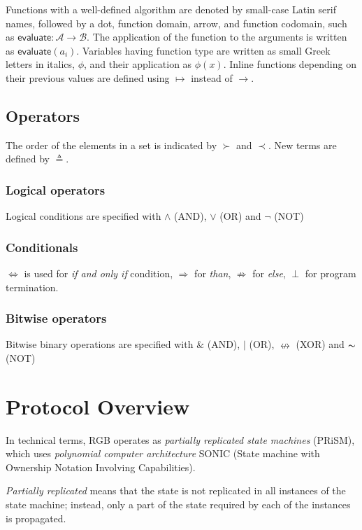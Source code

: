 \documentclass[9pt,oneside]{amsart}
\begin{document}
\begin{multicols}{2}
Functions with a well-defined algorithm are denoted by small-case Latin serif names,
followed by a dot, function domain, arrow, and function codomain,
such as $\mathsf{evaluate}: \mathcal{A} \rightarrow \mathcal{B}$.
The application of the function to the arguments is written as $\mathsf{evaluate}(a_i)$.
Variables having function type are written as small Greek letters in italics, $\phi$,
and their application as $\phi(x)$.
Inline functions depending on their previous values are defined using
$\mapsto$ instead of $\rightarrow$.

\subsection{Operators}
The order of the elements in a set is indicated by $\succ$ and $\prec$.
New terms are defined by $\triangleq$.

\subsubsection{Logical operators}
Logical conditions are specified with $\land$ (AND), $\lor$ (OR) and $\lnot$ (NOT)

\subsubsection{Conditionals}
$\Longleftrightarrow$ is used for \emph{if and only if} condition,
$\Rightarrow$ for \emph{than}, $\nRightarrow$ for \emph{else}, $\perp$ for program termination.

\subsubsection{Bitwise operators}
Bitwise binary operations are specified with $\&$ (AND), $|$ (OR), $\nleftrightarrow$ (XOR) and $\thicksim$ (NOT)

\section{Protocol Overview}

In technical terms, RGB operates as \emph{partially replicated state machines} (PRiSM),
which uses \emph{polynomial computer architecture} SONIC
(State machine with Ownership Notation Involving Capabilities).

\emph{Partially replicated} means that the state is not replicated in all instances
of the state machine; instead, only a part of the state required by each of the instances
is propagated.


\end{multicols}
\end{document}
